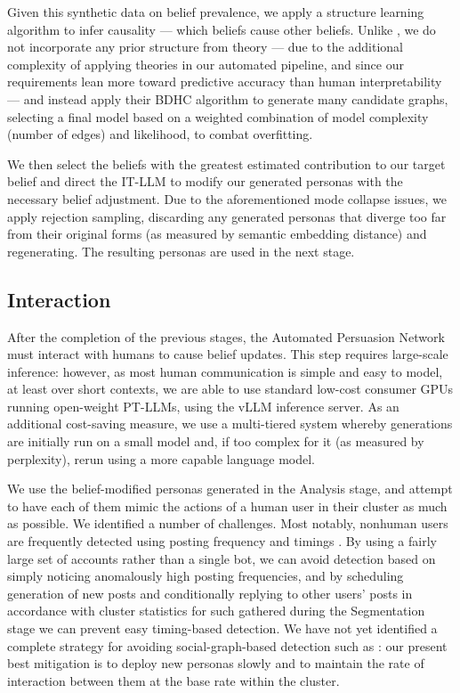 \documentclass[11pt]{article}
\begin{document}
Given this synthetic data on belief prevalence, we apply a structure learning algorithm to infer causality --- which beliefs cause other beliefs. Unlike \cite{powell2018}, we do not incorporate any prior structure from theory --- due to the additional complexity of applying theories in our automated pipeline, and since our requirements lean more toward predictive accuracy than human interpretability --- and instead apply their BDHC algorithm to generate many candidate graphs, selecting a final model based on a weighted combination of model complexity (number of edges) and likelihood, to combat overfitting.

We then select the beliefs with the greatest estimated contribution to our target belief and direct the IT-LLM to modify our generated personas with the necessary belief adjustment. Due to the aforementioned mode collapse issues, we apply rejection sampling, discarding any generated personas that diverge too far from their original forms (as measured by semantic embedding distance) and regenerating. The resulting personas are used in the next stage.

\subsection{Interaction}

After the completion of the previous stages, the Automated Persuasion Network must interact with humans to cause belief updates. This step requires large-scale inference: however, as most human communication is simple and easy to model, at least over short contexts, we are able to use standard low-cost consumer GPUs running open-weight PT-LLMs, using the vLLM\cite{kwon2023efficient} inference server. As an additional cost-saving measure, we use a multi-tiered system whereby generations are initially run on a small model and, if too complex for it (as measured by perplexity), rerun using a more capable language model.

We use the belief-modified personas generated in the Analysis stage, and attempt to have each of them mimic the actions of a human user in their cluster as much as possible. We identified a number of challenges. Most notably, nonhuman users are frequently detected using posting frequency\cite{howard2016bots} and timings \cite{Duh2018CollectiveBehavior}\cite{PAN2016193}. By using a fairly large set of accounts rather than a single bot, we can avoid detection based on simply noticing anomalously high posting frequencies, and by scheduling generation of new posts and conditionally replying to other users' posts in accordance with cluster statistics for such gathered during the Segmentation stage we can prevent easy timing-based detection. We have not yet identified a complete strategy for avoiding social-graph-based detection such as \cite{6547122}: our present best mitigation is to deploy new personas slowly and to maintain the rate of interaction between them at the base rate within the cluster.
\end{document}
